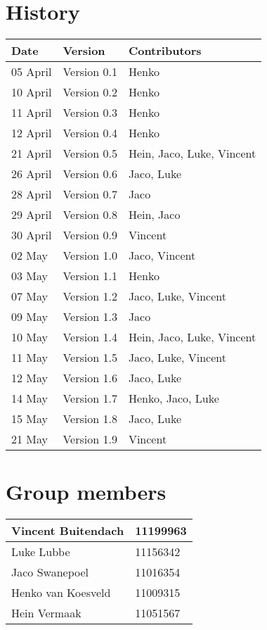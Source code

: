 
\section*{History}
\begin{center}
\begin{tabular}{|l|l|l|}
\hline
\textbf{Date} & \textbf{Version} & \textbf{Contributors}\\
\hline
05 April & Version 0.1 & Henko\\
\hline
10 April & Version 0.2 & Henko\\
\hline
11 April & Version 0.3 & Henko\\
\hline
12 April & Version 0.4 & Henko\\
\hline
21 April & Version 0.5 & Hein, Jaco, Luke, Vincent\\
\hline
26 April & Version 0.6 & Jaco, Luke\\
\hline
28 April & Version 0.7 & Jaco\\
\hline
29 April & Version 0.8 & Hein, Jaco\\
\hline
30 April & Version 0.9 & Vincent\\
\hline
02 May & Version 1.0 & Jaco, Vincent\\
\hline
03 May & Version 1.1 & Henko\\
\hline
07 May & Version 1.2 & Jaco, Luke, Vincent\\
\hline
09 May & Version 1.3 & Jaco\\
\hline
10 May & Version 1.4 & Hein, Jaco, Luke, Vincent\\
\hline
11 May & Version 1.5 & Jaco, Luke, Vincent\\
\hline
12 May & Version 1.6 & Jaco, Luke\\
\hline
14 May & Version 1.7 & Henko, Jaco, Luke\\
\hline
15 May & Version 1.8 & Jaco, Luke\\
\hline
21 May & Version 1.9 & Vincent\\
\end{tabular}

\vfill
\section*{Group members}

\begin{tabular}{|l|l|}

\hline
Vincent Buitendach & 11199963\\
\hline
Luke Lubbe & 11156342\\
\hline
Jaco Swanepoel & 11016354\\
\hline
Henko van Koesveld & 11009315\\
\hline
Hein Vermaak & 11051567\\
\hline

\end{tabular}

\end{center}

